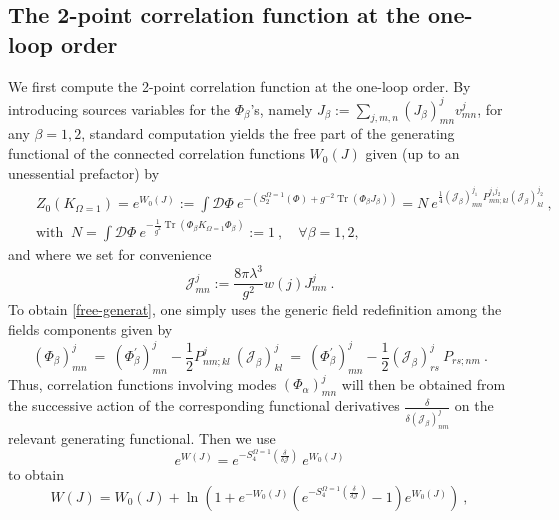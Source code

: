 \documentclass[a4paper,11pt,twoside]{article}
\numberwithin{equation}{section}
\DeclareMathOperator{\tr}{Tr}
\theoremstyle{nonumberplain}
\newcounter{and}
\begin{document}
\subsection{The 2-point correlation function at the one-loop order} \label{subsection32}

We first compute the 2-point correlation function at the one-loop order. By introducing sources variables for the $\Phi_\beta$'s, namely $J_\beta := \underset{j,m,n}{\sum}(J_\beta)^j_{mn}v^j_{mn}$, for any $\beta=1,2$, standard computation yields the free part of the generating functional of the connected correlation functions $W_0(J)$ given (up to an unessential prefactor) by%
%
\begin{eqnarray}
&& Z_0(K_{\Omega=1}) = e^{W_0(J)} := \int\mathcal{D}\Phi \ e^{-(S_2^{\Omega=1}(\Phi)+g^{-2}\tr(\Phi_\beta J_\beta))} 
= N \ e^{\frac{1}{4} (\mathcal{J}_\beta)^{j_1}_{mn} P^{j_1j_2}_{mn;kl} (\mathcal{J}_\beta)^{j_2}_{kl}} \ , \nonumber \\
&& \mbox{with } \ N = \int \mathcal{D}\Phi \ e^{-\frac{1}{g^2} \tr\left(\Phi_\beta K_{\Omega=1} \Phi_\beta \right)} := 1 \ , \quad \forall \beta=1,2, \label{free-generat}
\end{eqnarray}
%
and where we set for convenience%
%
\begin{equation}
\mathcal{J}^{j}_{mn} := \frac{8\pi\lambda^3}{g^2} w(j) J^{j}_{mn} \ . \label{source}
\end{equation}
%
To obtain \eqref{free-generat}, one simply uses the generic field redefinition among the fields components given by%
%
\begin{equation*}
(\Phi_\beta)^j_{mn} \ = \ (\Phi^\prime_\beta)_{mn}^j - \frac12 P^j_{nm;kl}\ (\mathcal{J}_\beta)^j_{kl} \ = \ (\Phi^\prime_\beta)_{mn}^j - \frac12 (\mathcal{J}_\beta)^j_{rs} \ P_{rs;nm} \ . 
\end{equation*}
%
Thus, correlation functions involving modes $(\Phi_\alpha)^j_{mn}$ will then be obtained from the successive action of the corresponding functional derivatives $\frac{\delta}{\delta(\mathcal{J}_\beta)^j_{nm}}$ on the relevant generating functional. Then we use%
%
\begin{equation*}
e^{W(J)} = e^{-S^{\Omega=1}_4\left(\frac{\delta}{\delta{\mathcal{J}}}\right)} \ e^{W_0(J)}
\end{equation*}
%
to obtain%
%
\begin{equation}
W(J) = W_0(J) + \ln\left( 1 + e^{-W_0(J)} \left( e^{-S^{\Omega=1}_4\left(\frac{\delta}{\delta{\mathcal{J}}}\right)} - 1 \right) e^{W_0(J)} \right) \ , \label{connected-funct}
\end{equation}
\end{document}
